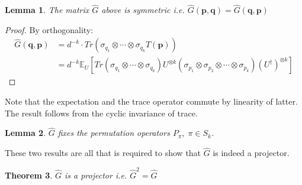 \documentclass[12pt]{amsart}
\newtheorem{theorem}{Theorem}[section]
\newtheorem{lemma}[theorem]{Lemma}
\theoremstyle{definition}
\theoremstyle{remark}
\numberwithin{equation}{section}
\theoremstyle{remark}
\begin{document}
\begin{lemma}
  The matrix $\widehat{G}$ above is symmetric i.e. $\widehat{G}(\textbf{p},\textbf{q}) = \widehat{G}(\textbf{q},\textbf{p})$
\end{lemma}
%
\begin{proof}
  By orthogonality:
  \begin{align}
    \widehat{G}(\textbf{q},\textbf{p})
    & = d^{-k} \cdot Tr(\sigma_{q_1} \otimes \cdots \otimes \sigma_{q_k} T(\textbf{p}) ) \\
    & = d^{-k} \mathbb{E}_{U}\left[ Tr(\sigma_{q_1} \otimes \cdots \otimes \sigma_{q_k}) U^{\otimes k} (\sigma_{p_1} \otimes \sigma_{p_2} \otimes \cdots \otimes \sigma_{p_k}) (U^\dagger)^{\otimes k}\right]
  \end{align}
\end{proof}
%
\noindent Note that the expectation and the trace operator commute by linearity of latter. The result follows from the cyclic invariance of trace.
%
\begin{lemma} \label{permfix}
$\widehat{G}$ fixes the permutation operators $P_{\pi}, \; \pi \in S_k$.
\end{lemma}
%
\noindent These two results are all that is required to show that $\widehat{G}$ is indeed a projector.
%
\begin{theorem} \label{g-proj}
  $\widehat{G}$ is a projector i.e. $\widehat{G}^2 = \widehat{G}$
\end{theorem}
%
\end{document}
